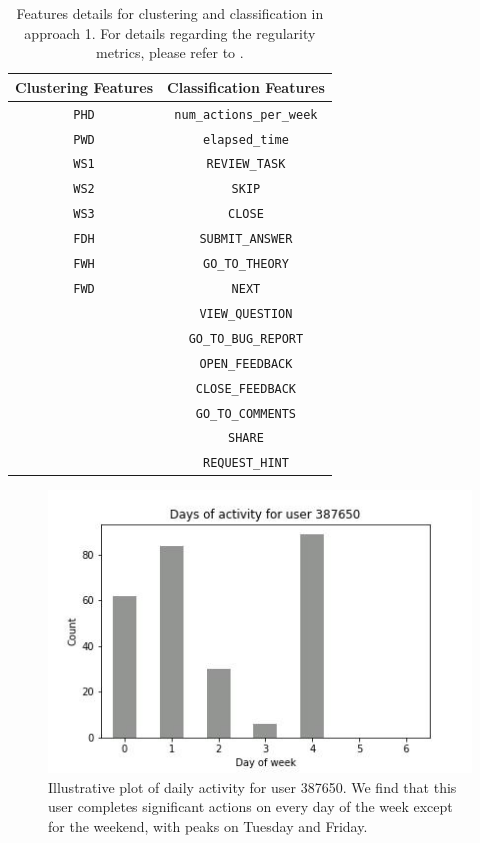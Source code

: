 \documentclass[sigplan,screen]{acmart}
\begin{document}
\begin{table}[h]
    \centering
    \begin{tabular}{|c|c|}
    \hline
        Clustering Features & Classification Features \\ \hline
        \texttt{PHD} & \texttt{num\_actions\_per\_week} \\ 
        \texttt{PWD} & \texttt{elapsed\_time} \\
        \texttt{WS1} & \texttt{REVIEW\_TASK} \\ 
        \texttt{WS2} &\texttt{SKIP} \\ 
        \texttt{WS3} &\texttt{CLOSE} \\ 
        \texttt{FDH} &\texttt{SUBMIT\_ANSWER} \\ 
        \texttt{FWH} &\texttt{GO\_TO\_THEORY} \\ 
        \texttt{FWD} &\texttt{NEXT} \\ 
        &\texttt{VIEW\_QUESTION} \\ 
        &\texttt{GO\_TO\_BUG\_REPORT} \\ 
        &\texttt{OPEN\_FEEDBACK} \\ 
        &\texttt{CLOSE\_FEEDBACK} \\ 
        &\texttt{GO\_TO\_COMMENTS} \\ 
        &\texttt{SHARE} \\ 
        &\texttt{REQUEST\_HINT} \\ \hline
    \end{tabular}
    \caption{Features details for clustering and classification in approach 1. For details regarding the regularity metrics, please refer to \cite{quantifyreg}.}
    \label{tab:A1_feature_vectors}
\end{table}

\begin{figure}
    \centering
    \includegraphics[width=\linewidth]{reports/figures/PWHex.jpg}
    \caption{Illustrative plot of daily activity for user 387650. We find that this user completes significant actions on every day of the week except for the weekend, with peaks on Tuesday and Friday.}
    \label{fig:PWHex}
\end{figure}
\end{document}
